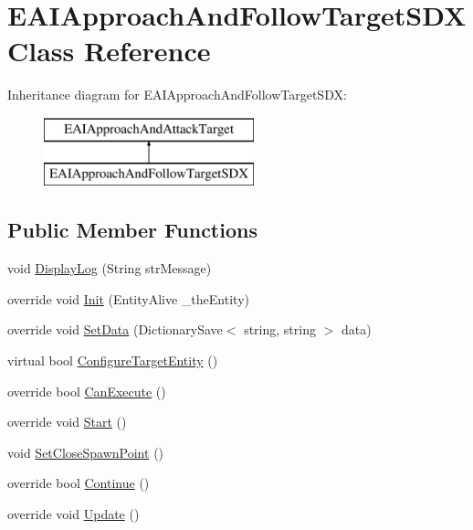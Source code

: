 \hypertarget{class_e_a_i_approach_and_follow_target_s_d_x}{}\section{E\+A\+I\+Approach\+And\+Follow\+Target\+S\+DX Class Reference}
\label{class_e_a_i_approach_and_follow_target_s_d_x}
Inheritance diagram for E\+A\+I\+Approach\+And\+Follow\+Target\+S\+DX\+:\begin{figure}[H]
\begin{center}
\leavevmode
\includegraphics[height=2.000000cm]{class_e_a_i_approach_and_follow_target_s_d_x}
\end{center}
\end{figure}
\subsection*{Public Member Functions}
\begin{DoxyCompactItemize}
\item 
void \mbox{\hyperlink{class_e_a_i_approach_and_follow_target_s_d_x_a56cb2c3da73cdb629a9354d2f3be8d06}{Display\+Log}} (String str\+Message)
\item 
override void \mbox{\hyperlink{class_e_a_i_approach_and_follow_target_s_d_x_ac2b966082c483ea7660520dddda21941}{Init}} (Entity\+Alive \+\_\+the\+Entity)
\item 
override void \mbox{\hyperlink{class_e_a_i_approach_and_follow_target_s_d_x_aee3cd22a7477f5f298c3a8d61adeacc6}{Set\+Data}} (Dictionary\+Save$<$ string, string $>$ data)
\item 
virtual bool \mbox{\hyperlink{class_e_a_i_approach_and_follow_target_s_d_x_ac0dde8a72e020fd849a86495b47c707d}{Configure\+Target\+Entity}} ()
\item 
override bool \mbox{\hyperlink{class_e_a_i_approach_and_follow_target_s_d_x_a4bd593810e37cd0adef6eef1575f44a9}{Can\+Execute}} ()
\item 
override void \mbox{\hyperlink{class_e_a_i_approach_and_follow_target_s_d_x_a5c8261a707932d140f698af8af1cb5f4}{Start}} ()
\item 
void \mbox{\hyperlink{class_e_a_i_approach_and_follow_target_s_d_x_a90ef1e3a5ebc7dfef60e74db82cdaf28}{Set\+Close\+Spawn\+Point}} ()
\item 
override bool \mbox{\hyperlink{class_e_a_i_approach_and_follow_target_s_d_x_aa6c1b4815975ccb63e7af74710fa4936}{Continue}} ()
\item 
override void \mbox{\hyperlink{class_e_a_i_approach_and_follow_target_s_d_x_af6a82c01d51c142df19ce0ae9f24d722}{Update}} ()
\end{DoxyCompactItemize}



